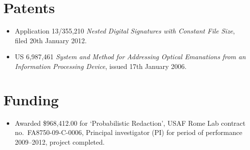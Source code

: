 \documentclass[letterpaper]{article}
\begin{document}
\section*{Patents} %

\begin{itemize}
	\item Application 13/355,210 \emph{Nested Digital Signatures with Constant File Size},
		filed 20th January 2012.

    \item US 6,987,461 \emph{System and Method for Addressing Optical
		Emanations from an Information Processing Device}, issued 17th January 2006.
\end{itemize}

\section*{Funding}

\begin{itemize}
	\item Awarded \$968,412.00 for `Probabilistic Redaction', USAF Rome Lab contract
	no.\ FA8750-09-C-0006, Principal investigator (PI) for period of performance
	2009--2012, project completed.
\end{itemize}
\end{document}
